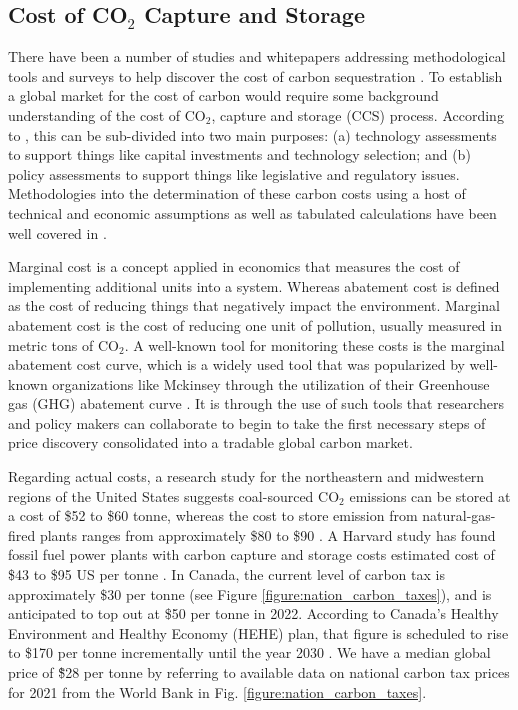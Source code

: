 \documentclass{article}
\begin{document}
\subsection{Cost of CO$_{2}$ Capture and Storage}

There have been a number of studies and whitepapers addressing methodological tools and surveys to help discover the cost of carbon sequestration \cite{Mck09,Gil18,Sch20,Dav00,Rub15,Rub07,Mck21}. To establish a global market for the cost of carbon would require some background understanding of the cost of CO$_{2}$, capture and storage (CCS) process. According to \cite{Rub15}, this can be sub-divided into two main purposes: (a) technology assessments to support things like capital investments and  technology selection; and (b) policy assessments to support things like legislative and regulatory issues. Methodologies into the determination of these carbon costs using a host of technical and economic assumptions as well as tabulated calculations have been well covered in \cite{Dav00,Rub07,Rub15}.

Marginal cost is a concept applied in economics that measures the cost of implementing additional units into a system. Whereas abatement cost is defined as the cost of reducing things that negatively impact the environment. Marginal abatement cost is the cost of reducing one unit of pollution, usually measured in metric tons of CO$_{2}$. A well-known tool for monitoring these costs is the marginal abatement cost curve, which is a widely used tool that was popularized by well-known organizations like Mckinsey through the utilization of their Greenhouse gas (GHG) abatement curve \cite{Mck09}. It is through the use of such tools that researchers and policy makers can collaborate to begin to take the first necessary steps of price discovery consolidated into a tradable global carbon market. 

Regarding actual costs, a research study for the northeastern and midwestern regions of the United States  suggests coal-sourced CO$_{2}$ emissions can be stored at a cost of \$52 to \$60 tonne, whereas the cost to store emission from natural-gas-fired plants ranges from approximately \$80 to \$90 \cite{Sch20}. A Harvard study has found fossil fuel power plants with carbon capture and storage costs estimated cost of \$43 to \$95 US per tonne \cite{Gil18}. In Canada, the current level of carbon tax is approximately \$30 per tonne (see Figure \ref{figure:nation_carbon_taxes}), and is anticipated to top out at \$50 per tonne in 2022. According to Canada's Healthy Environment and Healthy Economy (HEHE) plan, that figure is scheduled to rise to \$170 per tonne incrementally until the year 2030 \cite{Mck21}. We have a median global price of \~ \$28 per tonne by referring to available data on national carbon tax prices for 2021 from the World Bank in Fig. \ref{figure:nation_carbon_taxes}.
\end{document}
